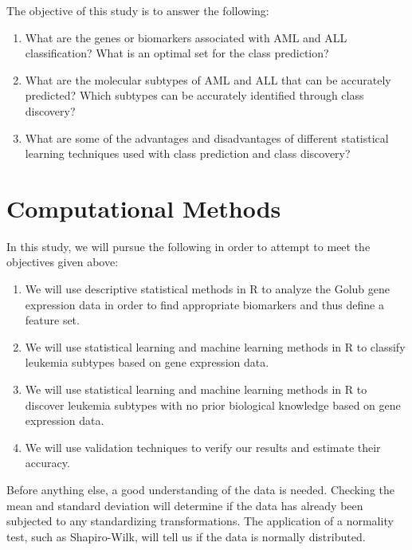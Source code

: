 \documentclass{article}
\begin{document}
The objective of this study is to answer the following:

\begin{enumerate}

  \item What are the genes or biomarkers associated with AML and ALL
    classification? What is an optimal set for the class prediction?

  \item What are the molecular subtypes of AML and ALL that can be
    accurately predicted? Which subtypes can be accurately identified
    through class discovery?

  \item What are some of the advantages and disadvantages of different
    statistical learning techniques used with class prediction and
    class discovery?

\end{enumerate}


\section{Computational Methods}

In this study, we will pursue the following in order to attempt to
meet the objectives given above:

\begin{enumerate}

  \item We will use descriptive statistical methods in R to analyze
    the Golub gene expression data in order to find appropriate
    biomarkers and thus define a feature set.

  \item We will use statistical learning and machine learning methods
    in R to classify leukemia subtypes based on gene expression data.

  \item We will use statistical learning and machine learning methods
    in R to discover leukemia subtypes with no prior biological
    knowledge based on gene expression data.

  \item We will use validation techniques to verify our results and
    estimate their accuracy.

\end{enumerate}

Before anything else, a good understanding of the data is
needed. Checking the mean and standard deviation will determine if the
data has already been subjected to any standardizing
transformations. The application of a normality test, such as
Shapiro-Wilk, will tell us if the data is normally distributed.
\end{document}
